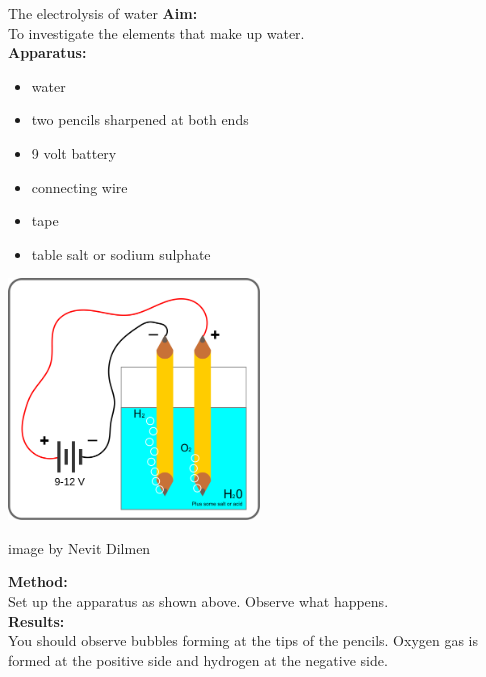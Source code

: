\begin{g_experiment}{The electrolysis of water}
\textbf{Aim:} \\
To investigate the elements that make up water.\\
\textbf{Apparatus:}\\
\begin{minipage}{.4\textwidth}
\begin{itemize}[noitemsep]
 \item water
\item two pencils sharpened at both ends
\item 9 volt battery
\item connecting wire
\item tape
\item table salt or sodium sulphate
\end{itemize}
\end{minipage}
\begin{minipage}{.6\textwidth} 
\begin{center}
   \includegraphics[width=0.5\textwidth]{photos/electrolysis.png}\\
\begin{caption}image by Nevit Dilmen\end{caption}
\end{center}
\end{minipage} \nopagebreak
\textbf{Method:}\\
Set up the apparatus as shown above. Observe what happens.\\
\textbf{Results:}\\
You should observe bubbles forming at the tips of the pencils. Oxygen gas is formed at the positive side and hydrogen at the negative side. 
\end{g_experiment}
            \nopagebreak
